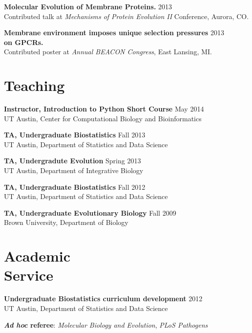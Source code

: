 \documentclass[line, margin]{res}
\begin{document}
\begin{resume}
\textbf{Molecular Evolution of Membrane Proteins.} \hfill 2013 \\ Contributed talk at \emph{Mechanisms of Protein Evolution II} Conference, Aurora, CO.

\textbf{Membrane environment imposes unique selection pressures} \hfill 2013 \\ \textbf{on GPCRs.} \\ Contributed poster at \emph{Annual BEACON Congress}, East Lansing, MI.

\vspace{0.75cm}


\section{Teaching} 

\textbf{Instructor, Introduction to Python Short Course} \hfill May 2014 \\ UT Austin, Center for Computational Biology and Bioinformatics

\textbf{TA, Undergraduate Biostatistics} \hfill Fall 2013 \\ UT Austin, Department of Statistics and Data Science

\textbf{TA, Undergradute Evolution} \hfill Spring 2013 \\ UT Austin, Department of Integrative Biology

\textbf{TA, Undergraduate Biostatistics} \hfill Fall 2012 \\ UT Austin, Department of 
Statistics and Data Science

\textbf{TA, Undergraduate Evolutionary Biology} \hfill Fall 2009 \\ Brown University, Department of Biology 

\vspace{0.75cm}

\section{Academic \\ Service} 

\textbf{Undergraduate Biostatistics curriculum development} \hfill 2012 \\UT Austin, Department of Statistics and Data Science

\textbf{\textit{Ad hoc} referee}: \textit{Molecular Biology and Evolution}, \textit{PLoS Pathogens} 

\end{resume}
\end{document}
